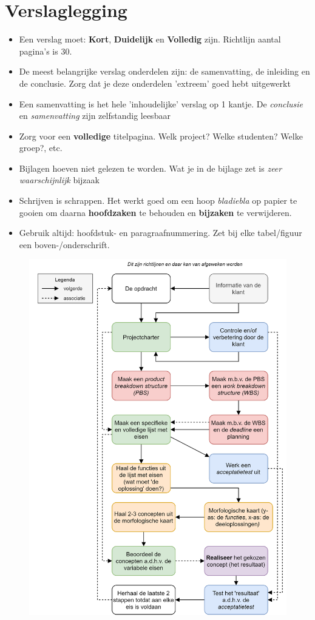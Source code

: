 \documentclass[24pt,a4paper]{article}
\begin{document}
\section{Verslaglegging}
\begin{itemize}
      \item Een verslag moet: \textbf{Kort}, \textbf{Duidelijk} en \textbf{Volledig} zijn. Richtlijn aantal pagina's is $30$.
      \item De meest belangrijke verslag onderdelen zijn: de samenvatting, de inleiding en de conclusie. Zorg dat je deze onderdelen 'extreem' goed hebt uitgewerkt
      \item Een samenvatting is het hele 'inhoudelijke' verslag op 1 kantje.
            De \textit{conclusie} en \textit{samenvatting} zijn zelfstandig leesbaar
      \item Zorg voor een \textbf{volledige} titelpagina. Welk project? Welke studenten? Welke groep?, etc.
      \item Bijlagen hoeven niet gelezen te worden. Wat je in de bijlage zet is \textit{zeer waarschijnlijk} bijzaak
      \item Schrijven is schrappen. Het werkt goed om een hoop \textit{bladiebla} op papier te gooien om daarna \textbf{hoofdzaken} te behouden en \textbf{bijzaken} te verwijderen.
      \item Gebruik altijd: hoofdstuk- en paragraafnummering. Zet bij elke tabel/figuur een boven-/onderschrift.
\end{itemize}


\newpage

\begin{figure}[tph]
      \centering
      \includegraphics[height=\textheight]{graphics/OntwerpMethodiekMechatronica.png}
\end{figure}
\end{document}
